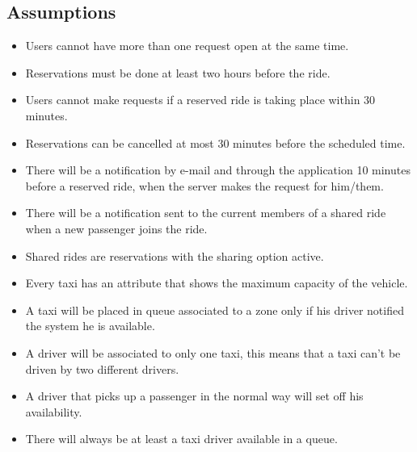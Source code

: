 \subsection{Assumptions}
	\begin{itemize}
		\item Users cannot have more than one request open at the same time.
		\item Reservations must be done at least two hours before the ride.
		\item Users cannot make requests if a reserved ride is taking place within 30 minutes.
		\item Reservations can be cancelled at most 30 minutes before the scheduled time.
		\item There will be a notification by e-mail and through the application 10 minutes before a reserved ride, when the server makes the request for him/them.
		\item There will be a notification sent to  the current members of a shared ride when a new passenger joins the ride.
		\item Shared rides are reservations with the sharing option active.
		\item Every taxi has an attribute that shows the maximum capacity of the vehicle.
		\item A taxi will be placed in queue associated to a zone only if his driver notified the system he is available.
		\item A driver will be associated to only one taxi, this means that a taxi can't be driven by two different drivers.
		\item A driver that picks up a passenger in the normal way will set off his availability.
		\item There will always be at least a taxi driver available in a queue.
	\end{itemize}

			